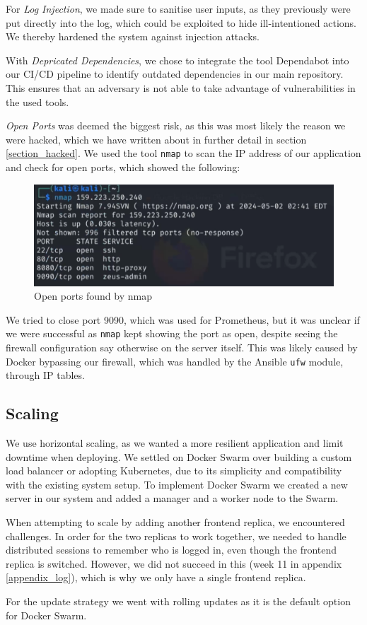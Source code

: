 For \textit{Log Injection}, we made sure to sanitise user inputs, as they previously were put directly into the log, which could be exploited to hide ill-intentioned actions. We thereby hardened the system against injection attacks.

With \textit{Depricated Dependencies}, we chose to integrate the tool Dependabot into our CI/CD pipeline to identify outdated dependencies in our main repository. This ensures that an adversary is not able to take advantage of vulnerabilities in the used tools.

\textit{Open Ports} was deemed the biggest risk, as this was most likely the reason we were hacked, which we have written about in further detail in section \ref{section_hacked}. We used the tool \texttt{nmap} to scan the IP address of our application and check for open ports, which showed the following:
\begin{figure}[H]
    \centering
    \includegraphics[width=1\linewidth]{images/nmap.png}
    \caption{Open ports found by nmap}
    \label{fig:matrix}
\end{figure}
We tried to close port 9090, which was used for Prometheus, but it was unclear if we were successful as \texttt{nmap} kept showing the port as open, despite seeing the firewall configuration say otherwise on the server itself. This was likely caused by Docker bypassing our firewall, which was handled by the Ansible \texttt{ufw} module, through IP tables.

\subsection{Scaling}
We use horizontal scaling, as we wanted a more resilient application and limit downtime when deploying. We settled on Docker Swarm over building a custom load balancer or adopting Kubernetes, due to its simplicity and compatibility with the existing system setup. To implement Docker Swarm we created a new server in our system and added a manager and a worker node to the Swarm.

When attempting to scale by adding another frontend replica, we encountered challenges. In order for the two replicas to work together, we needed to handle distributed sessions to remember who is logged in, even though the frontend replica is switched. However, we did not succeed in this (week 11 in appendix \ref{appendix_log}), which is why we only have a single frontend replica.

For the update strategy we went with rolling updates as it is the default option for Docker Swarm.
